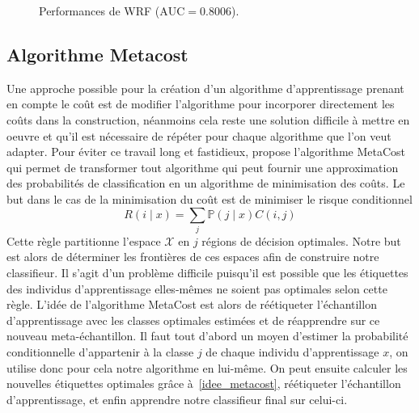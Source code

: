 \begin{figure}[htbp]
    \caption{Performances de WRF ($\mathrm{AUC} = 0.8006$).}
\end{figure}

\subsection{Algorithme Metacost}

Une approche possible pour la création d'un algorithme d'apprentissage prenant en compte le coût est de modifier l'algorithme pour incorporer directement les coûts dans la construction, néanmoins cela reste une solution difficile à mettre en oeuvre et qu'il est nécessaire de répéter pour chaque algorithme que l'on veut adapter. Pour éviter ce travail long et fastidieux, \citet{PedroD} propose l'algorithme MetaCost qui permet de transformer tout algorithme qui peut fournir une approximation des probabilités de classification en un algorithme de minimisation des coûts.
Le but dans le cas de la minimisation du coût est de minimiser le risque conditionnel 
\begin{equation}
    R ( i \mid x ) = \sum_j \mathbb{P} ( j \mid x ) C(i,j) \label{idee_metacost}
\end{equation}
Cette règle partitionne l'espace $\mathcal{X}$ en $j$ régions de décision optimales. Notre but est alors de déterminer les frontières de ces espaces afin de construire notre classifieur. Il s'agit d'un problème difficile puisqu'il est possible que les étiquettes des individus d'apprentissage elles-mêmes ne soient pas optimales selon cette règle. L'idée de l'algorithme MetaCost est alors de réétiqueter l'échantillon d'apprentissage avec les classes optimales estimées et de réapprendre sur ce nouveau meta-échantillon.
Il faut tout d'abord un moyen d'estimer la probabilité conditionnelle d'appartenir à la classe $j$ de chaque individu d'apprentissage $x$, on utilise donc pour cela notre algorithme en lui-même. On peut ensuite calculer les nouvelles étiquettes optimales grâce à~\ref{idee_metacost}, réétiqueter l'échantillon d'apprentissage, et enfin apprendre notre classifieur final sur celui-ci.

